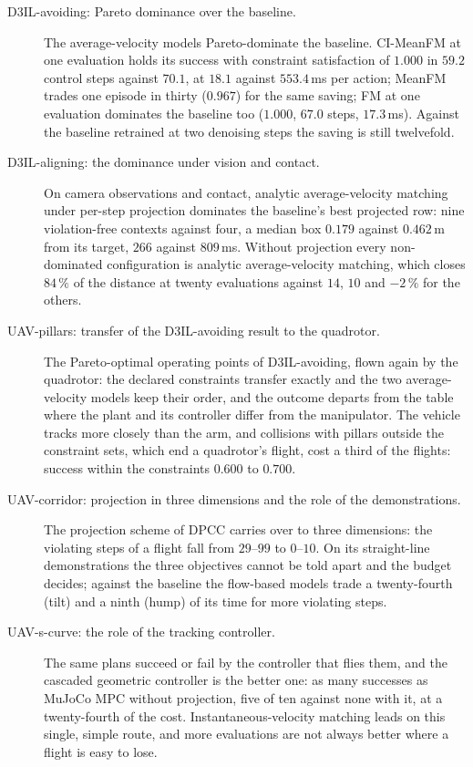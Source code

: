 \begin{description}
  \item[D3IL-avoiding: Pareto dominance over the baseline.] The average-velocity models Pareto-dominate the baseline.
    CI-MeanFM at one evaluation holds its success with constraint satisfaction of $1.000$ in $59.2$ control
    steps against $70.1$, at $18.1$ against $553.4$\,ms per action; MeanFM trades one episode in thirty
    ($0.967$) for the same saving; FM at one evaluation dominates the baseline too ($1.000$, $67.0$ steps,
    $17.3$\,ms). Against the baseline retrained at two denoising steps the saving is still twelvefold.
  \item[D3IL-aligning: the dominance under vision and contact.] On camera observations and contact, analytic average-velocity
    matching under per-step projection dominates the baseline's best projected row: nine violation-free
    contexts against four, a median box $0.179$ against $0.462$\,m from its target, $266$ against $809$\,ms.
    Without projection every non-dominated configuration is analytic average-velocity matching, which closes
    $84\,\%$ of the distance at twenty evaluations against $14$, $10$ and $-2\,\%$ for the others.
  \item[UAV-pillars: transfer of the D3IL-avoiding result to the quadrotor.] The Pareto-optimal operating points
    of D3IL-avoiding, flown again by the quadrotor: the declared constraints transfer exactly and the two
    average-velocity models keep their order, and the outcome departs from the table where the plant and its
    controller differ from the manipulator. The vehicle tracks more closely than the arm, and
    collisions with pillars outside the constraint sets, which end a quadrotor's flight, cost a third of the
    flights: success within the constraints $0.600$ to $0.700$.
  \item[UAV-corridor: projection in three dimensions and the role of the demonstrations.] The projection scheme
    of \ac{DPCC} carries over to three dimensions: the violating steps
    of a flight fall from $29$--$99$ to $0$--$10$. On its straight-line demonstrations the three objectives
    cannot be told apart and the budget decides; against the baseline the flow-based models trade a
    twenty-fourth (tilt) and a ninth (hump) of its time for more violating steps.
  \item[UAV-s-curve: the role of the tracking controller.] The same plans succeed or fail by the controller that flies
    them, and the cascaded geometric controller is the better one: as many successes as MuJoCo MPC without
    projection, five of ten against none with it, at a twenty-fourth of the cost. Instantaneous-velocity
    matching leads on this single, simple route, and more evaluations are not always better where a flight
    is easy to lose.
\end{description}

